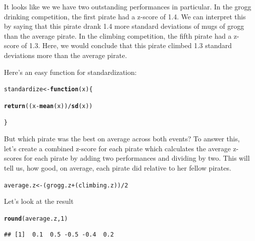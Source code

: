 \documentclass{tufte-book}\usepackage[]{graphicx}\usepackage[]{color}
\makeatletter
\newcommand{\hlnum}[1]{\textcolor[rgb]{0.686,0.059,0.569}{#1}}%
\newcommand{\hlopt}[1]{\textcolor[rgb]{0,0,0}{#1}}%
\newcommand{\hlstd}[1]{\textcolor[rgb]{0.345,0.345,0.345}{#1}}%
\newcommand{\hlkwa}[1]{\textcolor[rgb]{0.161,0.373,0.58}{\textbf{#1}}}%
\newcommand{\hlkwb}[1]{\textcolor[rgb]{0.69,0.353,0.396}{#1}}%
\newcommand{\hlkwc}[1]{\textcolor[rgb]{0.333,0.667,0.333}{#1}}%
\newcommand{\hlkwd}[1]{\textcolor[rgb]{0.737,0.353,0.396}{\textbf{#1}}}%
\newenvironment{kframe}{%
 \def\at@end@of@kframe{}%
 \ifinner\ifhmode%
  \def\at@end@of@kframe{\end{minipage}}%
  \begin{minipage}{\columnwidth}%
 \fi\fi%
 \def\FrameCommand##1{\hskip\@totalleftmargin \hskip-\fboxsep
 \colorbox{shadecolor}{##1}\hskip-\fboxsep
     \hskip-\linewidth \hskip-\@totalleftmargin \hskip\columnwidth}%
 \MakeFramed {\advance\hsize-\width
   \@totalleftmargin\z@ \linewidth\hsize
   \@setminipage}}%
 {\par\unskip\endMakeFramed%
 \at@end@of@kframe}
\newenvironment{knitrout}{}{} %
\makeatother
\begin{document}
It looks like we we have two outstanding performances in particular. In the grogg drinking competition, the first pirate had a z-score of 1.4. We can interpret this by saying that this pirate drank 1.4 more standard deviations of mugs of grogg than the average pirate. In the climbing competition, the fifth pirate had a z-score of 1.3. Here, we would conclude that this pirate climbed 1.3 standard deviations more than the average pirate.


\begin{marginfigure}

Here's an easy function for standardization:

\begin{knitrout}
\color{fgcolor}\begin{kframe}
\begin{alltt}
\hlstd{standardize} \hlkwb{<-} \hlkwa{function}\hlstd{(}\hlkwc{x}\hlstd{) \{}

  \hlkwd{return}\hlstd{((x} \hlopt{-} \hlkwd{mean}\hlstd{(x))} \hlopt{/} \hlkwd{sd}\hlstd{(x))}

\hlstd{\}}
\end{alltt}
\end{kframe}
\end{knitrout}

\end{marginfigure}

But which pirate was the best on average across both events? To answer this, let's create a combined z-score for each pirate which calculates the average z-scores for each pirate by adding two performances and dividing by two. This will tell us, how good, on average, each pirate did relative to her fellow pirates.

\begin{knitrout}
\color{fgcolor}\begin{kframe}
\begin{alltt}
\hlstd{average.z} \hlkwb{<-} \hlstd{(grogg.z} \hlopt{+} \hlstd{(climbing.z))} \hlopt{/} \hlnum{2}
\end{alltt}
\end{kframe}
\end{knitrout}

Let's look at the result

\begin{knitrout}
\color{fgcolor}\begin{kframe}
\begin{alltt}
\hlkwd{round}\hlstd{(average.z,} \hlnum{1}\hlstd{)}
\end{alltt}
\begin{verbatim}
## [1]  0.1  0.5 -0.5 -0.4  0.2
\end{verbatim}
\end{kframe}
\end{knitrout}
\end{document}
